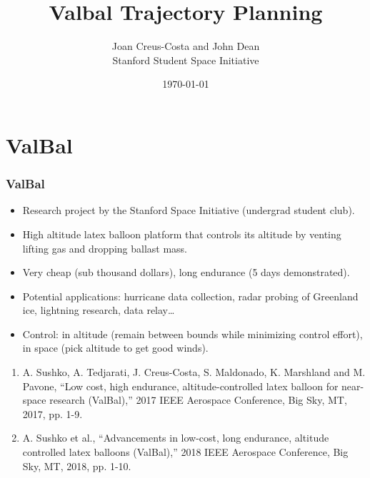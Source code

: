 \documentclass[10pt,mathserif]{beamer}
\title{\large \bfseries Valbal Trajectory Planning}
\author{Joan Creus-Costa and John Dean\\[3ex]
\small Stanford Student Space Initiative}
\date{\today}
\begin{document}
\frame{
\thispagestyle{empty}
\titlepage
}

\section{ValBal}
\begin{frame}
\frametitle{ValBal}

\begin{itemize}
\item Research project by the Stanford Space Initiative (undergrad student club).
\item High altitude latex balloon platform that controls its altitude by venting lifting gas and dropping ballast mass.
\item Very cheap (sub thousand dollars), long endurance (5 days demonstrated).
\item Potential applications: hurricane data collection, radar probing of Greenland ice, lightning research, data relay\dots
\item Control: in altitude (remain between bounds while minimizing control effort), in space (pick altitude to get good winds).
\end{itemize}
{\scriptsize
\begin{enumerate}
\item A. Sushko, A. Tedjarati, J. Creus-Costa, S. Maldonado, K. Marshland and M. Pavone, ``Low cost, high endurance, altitude-controlled latex balloon for near-space research (ValBal),'' 2017 IEEE Aerospace Conference, Big Sky, MT, 2017, pp. 1-9.
\item A. Sushko et al., ``Advancements in low-cost, long endurance, altitude controlled latex balloons (ValBal),'' 2018 IEEE Aerospace Conference, Big Sky, MT, 2018, pp. 1-10.
\end{enumerate}}
\end{frame}
\end{document}

